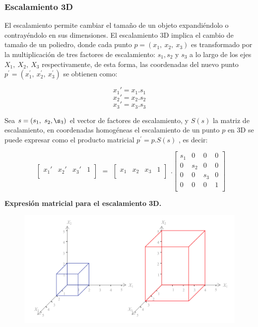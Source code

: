 \subsubsection{Escalamiento 3D}
El escalamiento permite cambiar el tamaño de un objeto expandiéndolo o
contrayéndolo en sus dimensiones.
El escalamiento 3D implica el cambio de tamaño de un poliedro, donde cada punto $p = (x_{1},\ x_{2},\ x_{3})$ es transformado por la multiplicación de tres factores de escalamiento: $s_{1}, s_{2}$ y $s_{3}$ a lo largo de los ejes $X_{1},\ X_{2},\ X_{3}$ respectivamente, de esta forma, las coordenadas del nuevo punto $p^{\prime} = (x_{1}^{ \prime},\ x_{2}^{ \prime},\ x_{3}^{ \prime})$ se obtienen como:

$$x_{1}{\prime} = x_{1}.s_{1}$$
$$x_{2}{\prime} = x_{2}.s_{2}$$
$$x_{3}{\prime} = x_{3}.s_{3}$$

Sea $s = (s_{1},\ s_{2},\s_{3})$ el vector de factores de escalamiento, y $S(s)$ la matriz de
escalamiento, en coordenadas homogéneas el escalamiento de un punto $p$ en 3D se puede expresar como el producto matricial
$p^{\prime} = p.S(s)$ , es decir:

$$
\begin{array}{rccl}
\left[
\begin{array}{rccl}
x_{1}{\prime} & x_{2}{\prime} & x_{3}{\prime} & 1\\
\end{array}
\right]
\end{array}
=
\begin{array}{rccl}
\left[
\begin{array}{rccl}
x_{1} & x_{2} & x_{3} & 1\\
\end{array}
\right]
\end{array} 
.
\left[
\begin{array}{rccl}
s_{1} & 0 & 0 & 0\\
0 & s_{2} & 0 & 0\\
0 & 0 & s_{3} & 0\\
0 & 0 & 0 & 1\\
\end{array}
\right]
$$

\begin{center}
\textbf{\footnotesize{Expresión matricial para el escalamiento 3D.}}
\end{center}

\begin{figure}[h]
\includegraphics[width=12cm]{Img/GEO/geo-escala.jpg}
\centering
\end{figure}

